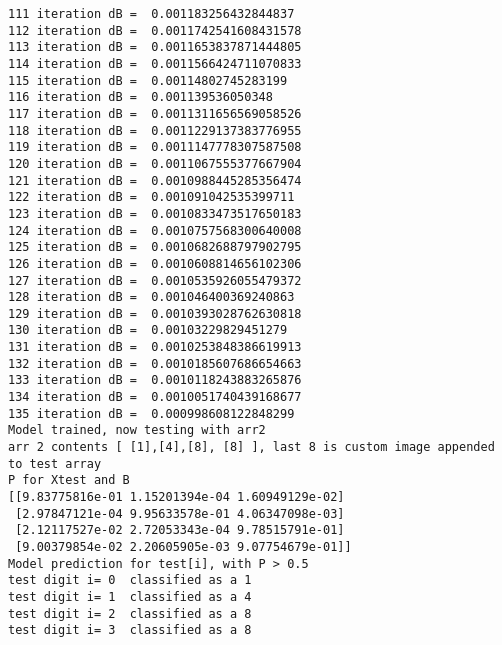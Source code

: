 \documentclass[11pt,a4paper]{article}
\begin{document}
\begin{verbatim}
111 iteration dB =  0.001183256432844837
112 iteration dB =  0.0011742541608431578
113 iteration dB =  0.0011653837871444805
114 iteration dB =  0.0011566424711070833
115 iteration dB =  0.00114802745283199
116 iteration dB =  0.001139536050348
117 iteration dB =  0.0011311656569058526
118 iteration dB =  0.0011229137383776955
119 iteration dB =  0.0011147778307587508
120 iteration dB =  0.0011067555377667904
121 iteration dB =  0.0010988445285356474
122 iteration dB =  0.001091042535399711
123 iteration dB =  0.0010833473517650183
124 iteration dB =  0.0010757568300640008
125 iteration dB =  0.0010682688797902795
126 iteration dB =  0.0010608814656102306
127 iteration dB =  0.0010535926055479372
128 iteration dB =  0.001046400369240863
129 iteration dB =  0.0010393028762630818
130 iteration dB =  0.00103229829451279
131 iteration dB =  0.0010253848386619913
132 iteration dB =  0.0010185607686654663
133 iteration dB =  0.0010118243883265876
134 iteration dB =  0.0010051740439168677
135 iteration dB =  0.000998608122848299
Model trained, now testing with arr2
arr 2 contents [ [1],[4],[8], [8] ], last 8 is custom image appended to test array
P for Xtest and B
[[9.83775816e-01 1.15201394e-04 1.60949129e-02]
 [2.97847121e-04 9.95633578e-01 4.06347098e-03]
 [2.12117527e-02 2.72053343e-04 9.78515791e-01]
 [9.00379854e-02 2.20605905e-03 9.07754679e-01]]
Model prediction for test[i], with P > 0.5
test digit i= 0  classified as a 1
test digit i= 1  classified as a 4
test digit i= 2  classified as a 8
test digit i= 3  classified as a 8
\end{verbatim}
\end{document}
